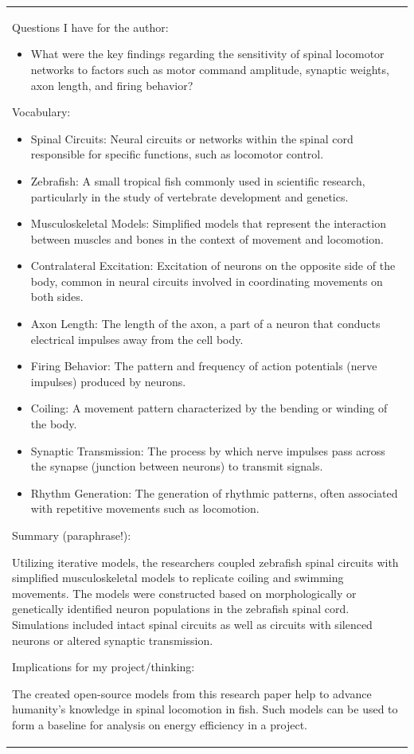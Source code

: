 \begin{longtable}[]{@{}
  >{\raggedright\arraybackslash}p{}@{}}
Questions I have for the author:

\begin{itemize}
\item
  What were the key findings regarding the sensitivity of spinal
  locomotor networks to factors such as motor command amplitude,
  synaptic weights, axon length, and firing behavior?
\end{itemize}


Vocabulary:

\begin{itemize}
\item
  Spinal Circuits: Neural circuits or networks within the spinal cord
  responsible for specific functions, such as locomotor control.
\item
  Zebrafish: A small tropical fish commonly used in scientific research,
  particularly in the study of vertebrate development and genetics.
\item
  Musculoskeletal Models: Simplified models that represent the
  interaction between muscles and bones in the context of movement and
  locomotion.
\item
  Contralateral Excitation: Excitation of neurons on the opposite side
  of the body, common in neural circuits involved in coordinating
  movements on both sides.
\item
  Axon Length: The length of the axon, a part of a neuron that conducts
  electrical impulses away from the cell body.
\item
  Firing Behavior: The pattern and frequency of action potentials (nerve
  impulses) produced by neurons.
\item
  Coiling: A movement pattern characterized by the bending or winding of
  the body.
\item
  Synaptic Transmission: The process by which nerve impulses pass across
  the synapse (junction between neurons) to transmit signals.
\item
  Rhythm Generation: The generation of rhythmic patterns, often
  associated with repetitive movements such as locomotion.
\end{itemize}


Summary (paraphrase!):

Utilizing iterative models, the researchers coupled zebrafish spinal
circuits with simplified musculoskeletal models to replicate coiling and
swimming movements. The models were constructed based on morphologically
or genetically identified neuron populations in the zebrafish spinal
cord. Simulations included intact spinal circuits as well as circuits
with silenced neurons or altered synaptic transmission.


Implications for my project/thinking:

The created open-source models from this research paper help to advance
humanity's knowledge in spinal locomotion in fish. Such models can be
used to form a baseline for analysis on energy efficiency in a project.

\midrule\noalign{}
\endhead
\bottomrule\noalign{}
\endlastfoot
\end{longtable}

